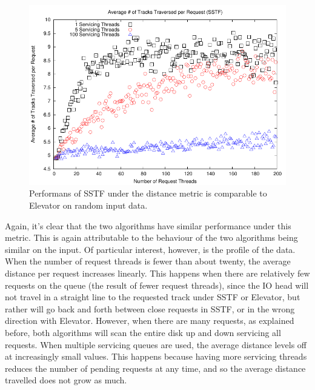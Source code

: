 \documentclass{report}
\begin{document}
\begin{figure}[htb!]
    \centering
    \includegraphics[scale=1]{distanceSSTF.pdf}
    \caption{Performans of SSTF under the distance metric is comparable to Elevator on
    random input data.}
    \label{fig:distanceSSTF}
\end{figure}
\newpage
Again, it's clear that the two algorithms have similar performance under this metric. This
is again attributable to the behaviour of the two algorithms being similar on the input.
Of particular interest, however, is the profile of the data. When the number of request
threads is fewer than about twenty, the average distance per request increases linearly.
This happens when there are relatively few requests on the queue
(the result of fewer request threads), since the IO head will not travel in a straight line to
the requested track under SSTF or Elevator, but rather will go back and forth between
close requests in SSTF, or in the wrong direction with Elevator. However, when there are
many requests, as explained before, both algorithms will scan the entire disk up and down
servicing all requests. When multiple servicing queues are used, the average distance 
levels off at increasingly
small values. This happens because having more servicing threads reduces the number of
pending requests at any time, and so the average distance travelled does not grow as
much.
\end{document}
